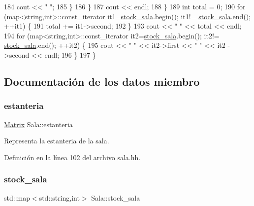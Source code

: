 \begin{DoxyCode}
184                 cout << \textcolor{stringliteral}{" "};
185             \}
186         \}
187         cout << endl;
188     \}
189     \textcolor{keywordtype}{int} total = 0;
190     \textcolor{keywordflow}{for} (map<string,int>::const\_iterator it1=\mbox{\hyperlink{class_sala_a7c9511997ba4a6fac93625fd3f5c7703}{stock\_sala}}.begin(); it1!=
      \mbox{\hyperlink{class_sala_a7c9511997ba4a6fac93625fd3f5c7703}{stock\_sala}}.end(); ++it1) \{
191         total += it1->second;
192     \}
193     cout << \textcolor{stringliteral}{"  "} << total << endl;
194     \textcolor{keywordflow}{for} (map<string,int>::const\_iterator it2=\mbox{\hyperlink{class_sala_a7c9511997ba4a6fac93625fd3f5c7703}{stock\_sala}}.begin(); it2!=
      \mbox{\hyperlink{class_sala_a7c9511997ba4a6fac93625fd3f5c7703}{stock\_sala}}.end(); ++it2) \{
195         cout << \textcolor{stringliteral}{"  "} << it2->first << \textcolor{stringliteral}{" "} << it2 ->second << endl;
196     \}
197 \}
\end{DoxyCode}


\subsection{Documentación de los datos miembro}
\mbox{\label{class_sala_a8f5264818c98db9c0d075c51a7672d95}} 
\subsubsection{\texorpdfstring{estanteria}{estanteria}}
{\footnotesize\ttfamily \mbox{\hyperlink{almacen_8hh_acdf2b2dca71b1d617c96d1afa6a525fa}{Matrix}} Sala\+::estanteria\hspace{0.3cm}{\ttfamily [private]}}



Representa la estanteria de la sala. 



Definición en la línea 102 del archivo sala.\+hh.

\mbox{\label{class_sala_a7c9511997ba4a6fac93625fd3f5c7703}} 
\subsubsection{\texorpdfstring{stock\+\_\+sala}{stock\_sala}}
{\footnotesize\ttfamily std\+::map$<$std\+::string,int$>$ Sala\+::stock\+\_\+sala\hspace{0.3cm}{\ttfamily [private]}}



